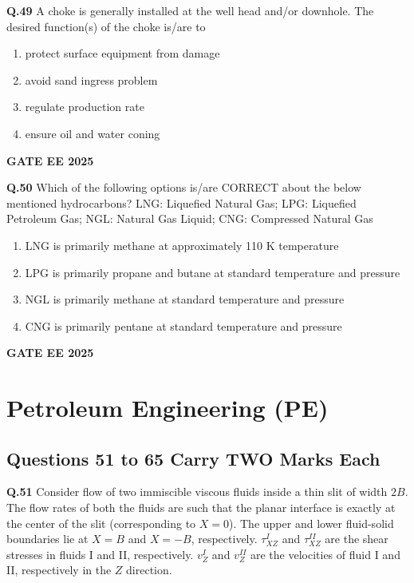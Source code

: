 \documentclass{article}
\begin{document}
\vspace{0.5cm}

\textbf{Q.49} A choke is generally installed at the well head and/or downhole. The desired function(s) of the choke is/are to
\begin{enumerate}[label=(\Alph*)]
    \item protect surface equipment from damage
    \item avoid sand ingress problem
    \item regulate production rate
    \item ensure oil and water coning
\end{enumerate}
\textbf{GATE EE 2025}

\vspace{0.5cm}

\textbf{Q.50} Which of the following options is/are CORRECT about the below mentioned hydrocarbons? 
LNG: Liquefied Natural Gas; LPG: Liquefied Petroleum Gas; NGL: Natural Gas Liquid; CNG: Compressed Natural Gas
\begin{enumerate}[label=(\Alph*)]
    \item LNG is primarily methane at approximately 110 K temperature
    \item LPG is primarily propane and butane at standard temperature and pressure
    \item NGL is primarily methane at standard temperature and pressure
    \item CNG is primarily pentane at standard temperature and pressure
\end{enumerate}
\textbf{GATE EE 2025}

\vspace{0.5cm}

\section*{Petroleum Engineering (PE)}

\subsection*{Questions 51 to 65 Carry TWO Marks Each}

\textbf{Q.51} Consider flow of two immiscible viscous fluids inside a thin slit of width $2B$. The flow rates of both the fluids are such that the planar interface is exactly at the center of the slit (corresponding to $X = 0$). The upper and lower fluid-solid boundaries lie at $X = B$ and $X = -B$, respectively. $\tau_{XZ}^I$ and $\tau_{XZ}^{II}$ are the shear stresses in fluids I and II, respectively. $v_Z^I$ and $v_Z^{II}$ are the velocities of fluid I and II, respectively in the $Z$ direction.
\end{document}

